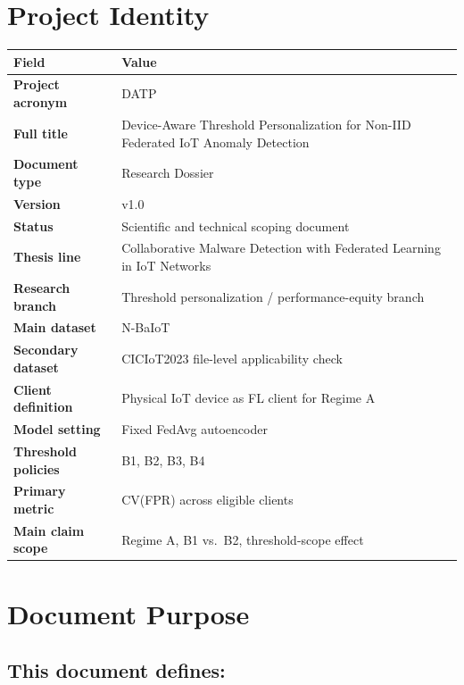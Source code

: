 
\section{Project Identity}

\begin{tabularx}{\linewidth}{@{} >{\bfseries}p{4.2cm} X @{}}
\toprule
\normalfont\textbf{Field} & \textbf{Value}\\
\midrule
Project acronym     & DATP\\[3pt]
Full title          & Device-Aware Threshold Personalization for Non-IID Federated IoT Anomaly Detection\\[3pt]
Document type       & Research Dossier\\[3pt]
Version             & v1.0\\[3pt]
Status              & Scientific and technical scoping document\\[3pt]
Thesis line         & Collaborative Malware Detection with Federated Learning in IoT Networks\\[3pt]
Research branch     & Threshold personalization / performance-equity branch\\[3pt]
Main dataset        & N-BaIoT\\[3pt]
Secondary dataset   & CICIoT2023 file-level applicability check\\[3pt]
Client definition   & Physical IoT device as FL client for Regime A\\[3pt]
Model setting       & Fixed FedAvg autoencoder\\[3pt]
Threshold policies  & B1, B2, B3, B4\\[3pt]
Primary metric      & CV(FPR) across eligible clients\\[3pt]
Main claim scope    & Regime A, B1 vs.\ B2, threshold-scope effect\\
\bottomrule
\end{tabularx}

\vspace{0.6em}

\section{Document Purpose}

\subsection*{This document defines:}

